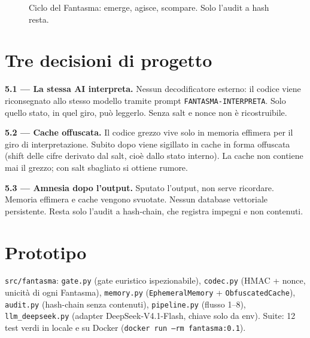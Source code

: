 \documentclass[11pt,a4paper]{article}
\begin{document}
\begin{figure}[h]
\centering
{}
\caption{Ciclo del Fantasma: emerge, agisce, scompare. Solo l'audit a hash resta.}
\end{figure}

\section{Tre decisioni di progetto}
\textbf{5.1 --- La stessa AI interpreta.} Nessun decodificatore esterno: il codice
viene riconsegnato allo stesso modello tramite prompt \texttt{FANTASMA-INTERPRETA}.
Solo quello stato, in quel giro, pu\`o leggerlo. Senza salt e nonce non \`e ricostruibile.

\textbf{5.2 --- Cache offuscata.} Il codice grezzo vive solo in memoria effimera per
il giro di interpretazione. Subito dopo viene sigillato in cache in forma offuscata
(shift delle cifre derivato dal salt, cio\`e dallo stato interno). La cache non contiene
mai il grezzo; con salt sbagliato si ottiene rumore.

\textbf{5.3 --- Amnesia dopo l'output.} Sputato l'output, non serve ricordare.
Memoria effimera e cache vengono svuotate. Nessun database vettoriale persistente.
Resta solo l'audit a hash-chain, che registra impegni e non contenuti.

\section{Prototipo}
\texttt{src/fantasma}: \texttt{gate.py} (gate euristico ispezionabile),
\texttt{codec.py} (HMAC + nonce, unicit\`a di ogni Fantasma),
\texttt{memory.py} (\texttt{EphemeralMemory} + \texttt{ObfuscatedCache}),
\texttt{audit.py} (hash-chain senza contenuti),
\texttt{pipeline.py} (flusso 1--8),
\texttt{llm\_deepseek.py} (adapter DeepSeek-V4.1-Flash, chiave solo da env).
Suite: 12 test verdi in locale e su Docker (\texttt{docker run --rm fantasma:0.1}).
\end{document}
